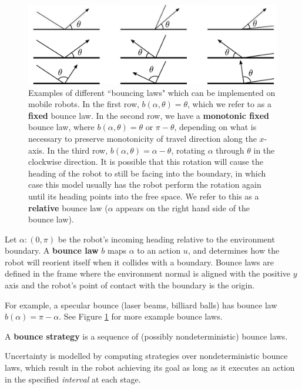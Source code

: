 \documentclass[]{styles/svproc}  %
\begin{document}
\begin{figure}
    \includegraphics[width=0.8\linewidth]{figures/bounce_examples.pdf}
    \centering
    \caption[test]{\label{fig:bex}Examples of different ``bouncing laws" which can be implemented on
mobile robots. In the first row, $b(\alpha, \theta) = \theta$, which we refer to
as a \textbf{fixed} bounce law. In the second row, we have a \textbf{monotonic
fixed} bounce law, where
$b(\alpha, \theta) = \theta$ or $\pi-\theta$, depending on what is necessary to
preserve monotonicity of travel direction along the $x$-axis. In the third
row, $b(\alpha, \theta) = \alpha - \theta$, rotating $\alpha$ through $\theta$ in the clockwise
direction. It is possible that this rotation will cause the 
heading of the robot to still be facing into the boundary, in which case this model usually has the robot 
perform the rotation again until its heading points into the free space. We
refer to this as a \textbf{relative} bounce law ($\alpha$ appears on the
right hand side of the bounce law).
}
\end{figure}

\begin{definition}
Let $\alpha: (0,\pi)$ be the robot's incoming heading relative to the
environment boundary. A \textbf{bounce law} $b$ maps $\alpha$ to an action
$u$, and determines how the robot will reorient itself when it collides with a
boundary. Bounce laws are defined in the
frame where the environment normal is aligned with the positive $y$ axis and the
robot's point of contact with the boundary is the origin. 
\end{definition}

For example, a specular bounce (laser beams, billiard balls) has bounce law
$b(\alpha) = \pi - \alpha$. See Figure \ref{fig:bex} for more
example bounce laws. 

\begin{definition}
A \textbf{bounce strategy} is a sequence of (possibly nondeterministic) bounce
laws.
\end{definition}

Uncertainty is modelled by computing strategies over nondeterministic bounce
laws, which result in the robot achieving its goal as long as it executes an
action in the specified \emph{interval} at each stage.
\end{document}
